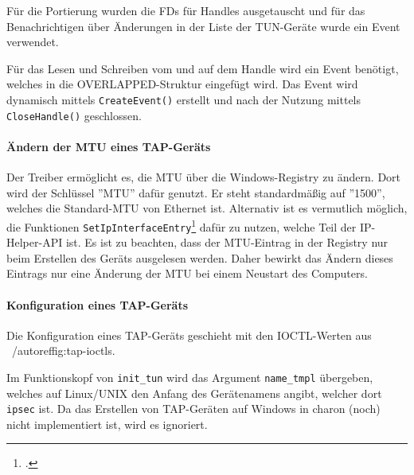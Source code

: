 {Für die Portierung wurden die \acp{FD} für Handles ausgetauscht und für das Benachrichtigen
über Änderungen in der Liste der TUN-Geräte wurde ein Event verwendet.

Für das Lesen und Schreiben vom und auf dem Handle wird ein Event benötigt,
welches in die OVERLAPPED-Struktur eingefügt wird. Das Event wird dynamisch mittels \texttt{CreateEvent()}
erstellt und nach der Nutzung mittels \texttt{CloseHandle()} geschlossen.

\paragraph{Ändern der MTU eines TAP-Geräts}
Der Treiber ermöglicht es,
die \ac{MTU} über die Windows-Registry zu ändern. Dort wird der Schlüssel ''MTU''
dafür genutzt. Er steht standardmäßig auf ''1500'', welches die Standard-\ac{MTU}
von Ethernet ist. Alternativ ist es vermutlich möglich, die Funktionen 
\texttt{SetIpInterfaceEntry}\footcite[][]{_setipinterfaceentry_2016} dafür zu nutzen, welche Teil der IP-Helper-\ac{API} ist.
Es ist zu beachten, dass der \ac{MTU}-Eintrag in der Registry nur beim Erstellen des Geräts
ausgelesen werden. Daher bewirkt das Ändern dieses Eintrags nur eine Änderung
der \ac{MTU} bei einem Neustart des Computers.

\paragraph{Konfiguration eines TAP-Geräts}
Die Konfiguration eines TAP-Geräts geschieht mit den IOCTL-Werten aus ~/autoref{fig:tap-ioctls}.

Im Funktionskopf von \texttt{init\_tun} wird das Argument \texttt{name\_tmpl} übergeben,
welches auf Linux/UNIX den Anfang des Gerätenamens angibt, welcher dort \texttt{ipsec}
ist. Da das Erstellen von TAP-Geräten auf Windows in charon (noch) nicht implementiert
ist, wird es ignoriert.

}
